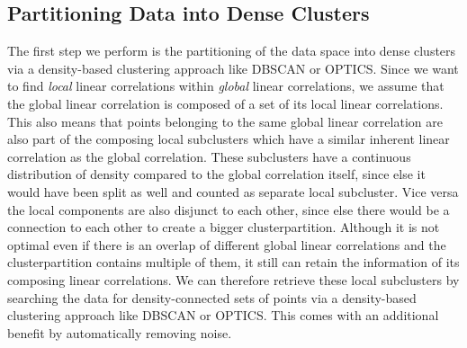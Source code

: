 \subsection{Partitioning Data into Dense Clusters}
The first step we perform is the partitioning of the data space into dense clusters via a density-based clustering approach like \ac{DBSCAN} or \ac{OPTICS}. 
Since we want to find \textit{local} linear correlations within \textit{global} linear correlations, we assume that the global linear correlation is composed of a set of its local linear correlations. This also means that points belonging to the same global linear correlation are also part of the composing local subclusters which have a similar inherent linear correlation as the global correlation. These subclusters have a continuous distribution of density compared to the global correlation itself, since else it would have been split as well and counted as separate local subcluster. Vice versa the local components are also disjunct to each other, since else there would be a connection to each other to create a bigger clusterpartition. Although it is not optimal even if there is an overlap of different global linear correlations and the clusterpartition contains multiple of them, it still can retain the information of its composing linear correlations.
We can therefore retrieve these local subclusters by searching the data for density-connected sets of points via a density-based clustering approach like \ac{DBSCAN} or \ac{OPTICS}. This comes with an additional benefit by automatically removing noise. 

